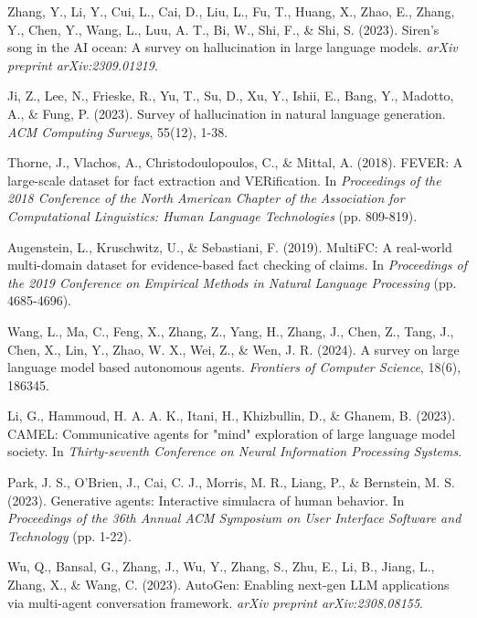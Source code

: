 \documentclass{article}
\begin{document}
\begin{thebibliography}{99}

Zhang, Y., Li, Y., Cui, L., Cai, D., Liu, L., Fu, T., Huang, X., Zhao, E., Zhang, Y., Chen, Y., Wang, L., Luu, A. T., Bi, W., Shi, F., \& Shi, S. (2023). Siren's song in the AI ocean: A survey on hallucination in large language models. \textit{arXiv preprint arXiv:2309.01219}.

Ji, Z., Lee, N., Frieske, R., Yu, T., Su, D., Xu, Y., Ishii, E., Bang, Y., Madotto, A., \& Fung, P. (2023). Survey of hallucination in natural language generation. \textit{ACM Computing Surveys}, 55(12), 1-38.

Thorne, J., Vlachos, A., Christodoulopoulos, C., \& Mittal, A. (2018). FEVER: A large-scale dataset for fact extraction and VERification. In \textit{Proceedings of the 2018 Conference of the North American Chapter of the Association for Computational Linguistics: Human Language Technologies} (pp. 809-819).

Augenstein, L., Kruschwitz, U., \& Sebastiani, F. (2019). MultiFC: A real-world multi-domain dataset for evidence-based fact checking of claims. In \textit{Proceedings of the 2019 Conference on Empirical Methods in Natural Language Processing} (pp. 4685-4696).

Wang, L., Ma, C., Feng, X., Zhang, Z., Yang, H., Zhang, J., Chen, Z., Tang, J., Chen, X., Lin, Y., Zhao, W. X., Wei, Z., \& Wen, J. R. (2024). A survey on large language model based autonomous agents. \textit{Frontiers of Computer Science}, 18(6), 186345.

Li, G., Hammoud, H. A. A. K., Itani, H., Khizbullin, D., \& Ghanem, B. (2023). CAMEL: Communicative agents for "mind" exploration of large language model society. In \textit{Thirty-seventh Conference on Neural Information Processing Systems}.

Park, J. S., O'Brien, J., Cai, C. J., Morris, M. R., Liang, P., \& Bernstein, M. S. (2023). Generative agents: Interactive simulacra of human behavior. In \textit{Proceedings of the 36th Annual ACM Symposium on User Interface Software and Technology} (pp. 1-22).

Wu, Q., Bansal, G., Zhang, J., Wu, Y., Zhang, S., Zhu, E., Li, B., Jiang, L., Zhang, X., \& Wang, C. (2023). AutoGen: Enabling next-gen LLM applications via multi-agent conversation framework. \textit{arXiv preprint arXiv:2308.08155}.


\end{thebibliography}
\end{document}
